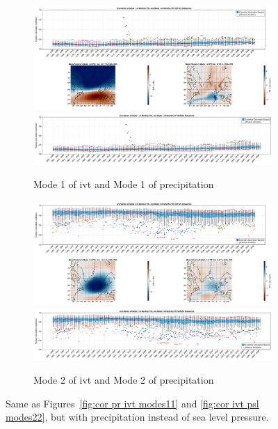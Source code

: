 \begin{figure}[!tbp]
  \begin{subfigure}[b]{0.49\textwidth}
    \includegraphics[width=\textwidth]{figures/correlation_boxplot_psl_pr_modes11_ssp126_50seasons.png}
    \includegraphics[width=\textwidth]{figures/correlation_boxplot_psl_pr_modes11_ssp585_50seasons.png}
    \caption{Mode 1 of \ac{ivt} and Mode 1 of precipitation}
    \label{fig:cor psl pr modes11}
  \end{subfigure}
  \hfill
  \begin{subfigure}[b]{0.49\textwidth}
    \includegraphics[width=\textwidth]{figures/correlation_boxplot_psl_pr_modes22_ssp126_50seasons.png}
    \includegraphics[width=\textwidth]{figures/correlation_boxplot_psl_pr_modes22_ssp585_50seasons.png}
    \caption{Mode 2 of \ac{ivt} and Mode 2 of precipitation}
    \label{fig:cor psl pr modes22}
  \end{subfigure}
  \caption{Same as Figures~\ref{fig:cor pr ivt modes11} and \ref{fig:cor ivt psl modes22}, but with precipitation instead of sea level pressure.}
\end{figure}

